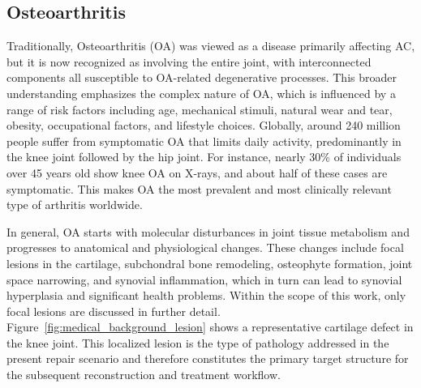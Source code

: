 \subsection{Osteoarthritis}
Traditionally, Osteoarthritis (OA) was viewed as a disease primarily affecting AC, but it is now recognized as involving the entire joint, with interconnected components all susceptible to OA-related degenerative processes. This broader understanding emphasizes the complex nature of OA, which is influenced by a range of risk factors including age, mechanical stimuli, natural wear and tear, obesity, occupational factors, and lifestyle choices. Globally, around 240 million people suffer from symptomatic OA that limits daily activity, predominantly in the knee joint followed by the hip joint. For instance, nearly 30\% of individuals over 45 years old show knee OA on X-rays, and about half of these cases are symptomatic. This makes OA the most prevalent and most clinically relevant type of arthritis worldwide.\cite{Oliveira2017}

In general, OA starts with molecular disturbances in joint tissue metabolism and progresses to anatomical and physiological changes. These changes include focal lesions in the cartilage, subchondral bone remodeling, osteophyte formation, joint space narrowing, and synovial inflammation, which in turn can lead to synovial hyperplasia and significant health problems. Within the scope of this work, only focal lesions are discussed in further detail.\cite{Oliveira2017} Figure~\ref{fig:medical_background_lesion} shows a representative cartilage defect in the knee joint. This localized lesion is the type of pathology addressed in the present repair scenario and therefore constitutes the primary target structure for the subsequent reconstruction and treatment workflow.

